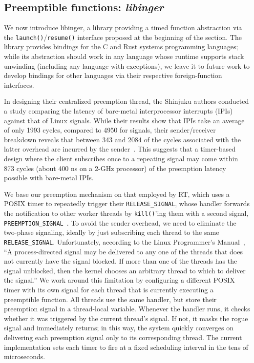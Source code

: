 \subsection{Preemptible functions: \textit{libinger}}
\label{sec:libinger}

We now introduce libinger, a library providing a timed function abstraction via the
\texttt{launch()}/\texttt{resume()} interface proposed at the beginning of the
section.  The library provides bindings for the C and Rust systems programming
languages; while its abstraction should work in any language whose runtime supports
stack unwinding (including any language with exceptions), we leave it to future work
to develop bindings for other languages via their respective foreign-function
interfaces.

In designing their centralized preemption thread, the Shinjuku authors conducted a
study comparing the latency of bare-metal interprocessor interrupts (IPIs) against
that of Linux signals.  While their results show that IPIs take an average of only
1993 cycles, compared to 4950 for signals, their sender/receiver breakdown reveals
that between 343 and 2084 of the cycles associated with the latter overhead are
incurred by the sender~\cite{Kaffes:nsdi2019}.  This suggests that a timer-based
design where the client subscribes once to a repeating signal may come within 873
cycles (about 400 ns on a 2-GHz processor) of the preemption latency possible with
bare-metal IPIs.

We base our preemption mechanism on that employed by RT, which uses a POSIX timer to
repeatedly trigger their \texttt{RELEASE\_SIGNAL}, whose handler forwards the
notification to other worker threads by \texttt{kill()}'ing them with a second
signal, \texttt{PREEMPTION\_SIGNAL}~\cite{mollison:rtas2013}.  To avoid the sender
overhead, we need to eliminate the two-phase signaling, ideally by just subscribing
each thread to the same \texttt{RELEASE\_SIGNAL}.  Unfortunately, according to the
Linux Programmer's Manual~\cite{signal-manpage}, ``A process-directed signal may be
delivered to any one of the threads that does not currently have the signal blocked.
If more than one of the threads has the signal unblocked, then the kernel chooses an
arbitrary thread to which to deliver the signal.''  We work around this limitation by
configuring a different POSIX timer with its own signal for each thread that is
currently executing a preemptible function.  All threads use the same handler, but
store their preemption signal in a thread-local variable.  Whenever the handler runs,
it checks whether it was triggered by the current thread's signal.  If not, it masks
the rogue signal and immediately returns; in this way, the system quickly converges
on delivering each preemption signal only to its corresponding thread.  The current
implementation sets each timer to fire at a fixed scheduling interval in the tens of
microseconds.

